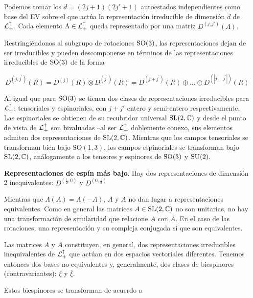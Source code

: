  Podemos tomar los $d=(2j+1)(2j'+1)$ autoestados independientes como base del EV sobre el que actúa la representación irreducible de dimensión $d$ de $\mathcal{L}_+^\uparrow$. Cada elemento $\Lambda\in\mathcal{L}_+^\uparrow$ queda representado por una matriz $D^{(j,j')}(\Lambda)$. \bigskip

Restringiéndonos al subgrupo de rotaciones $\mathrm{SO}(3)$, las representaciones dejan de ser irreducibles y pueden descomponerse en términos de las representaciones irreducibles de $\mathrm{SO}(3)$ de la forma

\begin{equation}
D^{\left(j, j^{\prime}\right)}(R)=D^{(j)}(R) \otimes D^{\left(j^{\prime}\right)}(R)=D^{\left(j+j^{\prime}\right)}(R) \oplus \ldots \oplus D^{\left(\left|j-j^{\prime}\right|\right)}(R)
\end{equation}

Al igual que para $\mathrm{SO}(3)$ se tienen dos clases de representaciones irreducibles para $\mathcal{L}_+^\uparrow$: tensoriales y espinoriales, con $j+j'$ entero y semi-entero respectivamente. Las espinoriales se obtienen de su recubridor universal $\mathrm{SL}(2,\mathbb{C})$ y desde el punto de vista de $\mathcal{L}_+^\uparrow$ son bivaluadas --al ser $\mathcal{L}_+^\uparrow$ doblemente conexo, sus elementos admiten dos representaciones de $\mathrm{SL}(2,\mathbb{C})$. Mientras que los campos tensoriales se transforman bien  bajo $\mathrm{SO}(1,3)$, los campos espinoriales se transforman bajo $\mathrm{SL}(2,\mathbb{C})$, análogamente a los tensores y espinores de $\mathrm{SO}(3)$ y $\mathrm{SU}(2)$.

\begin{flushleft}
\textbf{Representaciones de espín más bajo}. Hay dos representaciones de dimensión 2 inequivalentes: $D^{(\frac{1}{2},0)}$ y $D^{(0,\frac{1}{2})}$
\end{flushleft}

Mientras que $\Lambda(A)=\Lambda(-A)$, $A$ y $\bar{A}$ no dan lugar a representaciones equivalentes. Como en general las matrices $A\in \mathrm{SL}(2,\mathbb{C})$ no son unitarias, no hay una transformación de similaridad que relacione $A$ con $\bar{A}$. En el caso de las rotaciones, una representación y su compleja conjugada sí que son equivalentes.\medskip

Las matrices $A$ y $\bar{A}$ constituyen, en general, dos representaciones irreducibles inequivalentes de $\mathcal{L}_+^\uparrow$ que actúan en dos espacios vectoriales diferentes. Tenemos entonces dos bases no equivalentes y, generalmente, dos clases de biespinores (contravariantes): $\xi$ y $\overline{\xi}$.\medskip

Estos biespinores se transforman de acuerdo a 


